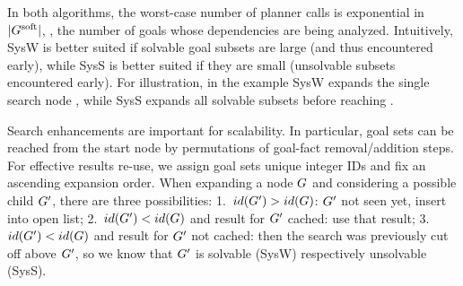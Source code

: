 In both algorithms, the worst-case number of planner calls is
exponential in $|G^{\text{\textup{soft}}}|$, \ie, the number of goals whose
dependencies are being analyzed. Intuitively, SysW is better suited if
solvable goal subsets are large (and thus encountered early), while
SysS is better suited if they are small (unsolvable subsets
encountered early). For illustration, in the example SysW expands the
single search node \goalsoft, while SysS expands all solvable subsets
before reaching \goalsoft.

%
%
%
%
%
%
%


Search enhancements are important for scalability. In particular, goal
sets can be reached from the start node by permutations of goal-fact
removal/addition steps. For effective results re-use, we assign goal
sets unique integer IDs and fix an ascending expansion order. When
expanding a node $G$ and considering a possible child $G'$,
there are three possibilities: 1.\ $id(G') > id(G)$: $G'$
not seen yet, insert into open list; 2.\ $id(G') < id(G)$ and
result for $G'$ cached: use that result; 3.\ $id(G') <
id(G)$ and result for $G'$ not cached: then the search was
previously cut off above $G'$, so we know that $G'$ is
solvable (SysW) respectively unsolvable (SysS).

